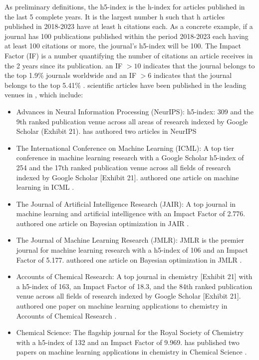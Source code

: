 \documentclass[11pt]{article}
\begin{document}
As preliminary definitions, the h5-index is the h-index for articles published in the last 5 complete years. It is the largest number h such that h articles published in 2018-2023 have at least h citations each. As a concrete example, if a journal has 100 publications published within the period 2018-2023 each having at least 100 citations or more, the journal's h5-index will be 100. The Impact Factor (IF) is a number quantifying the number of citations an article receives in the 2 years since its publication. an IF $> 10$ indicates that the journal belongs to the top 1.9\% journals worldwide and an IF $> 6$ indicates that the journal belongs to the top 5.41\% \cite{impact_factor}. \drs scientific articles have been published in the leading venues in \fie{}, which include:
\begin{itemize}
    \item Advances in Neural Information Processing (NeurIPS): h5-index: 309 and the 9th ranked publication venue across all areas of research indexed by Google Scholar (Exhibit 21). \dr has authored two articles in NeurIPS \cite{cv, gauche, chatgpt}
    \item The International Conference on Machine Learning (ICML): A top tier conference in machine learning research with a Google Scholar h5-index of 254 and the 17th ranked publication venue across all fields of research indexed by Google Scholar [Exhibit 21]. \dr authored one article on machine learning in ICML \cite{sensors}.
    \item The Journal of Artificial Intelligence Research (JAIR): A top journal in machine learning and artificial intelligence with an Impact Factor of 2.776. \dr authored one article on Bayesian optimization in JAIR \cite{cv, hebo}.
    \item The Journal of Machine Learning Research (JMLR): JMLR is the premier journal for machine learning research with a h5-index of 106 and an Impact Factor of 5.177. \dr authored one article on Bayesian optimization in JMLR \cite{cv, forget}.
    \item Accounts of Chemical Research: A top journal in chemistry [Exhibit 21] with a h5-index of 163, an Impact Factor of 18.3, and the 84th ranked publication venue across all fields of research indexed by Google Scholar [Exhibit 21]. \dr authored one paper on machine learning applications to chemistry in Accounts of Chemical Research \cite{cv, mapping}.    
    \item Chemical Science: The flagship journal for the Royal Society of Chemistry with a h5-index of 132 and an Impact Factor of 9.969. \dr has published two papers on machine learning applications in chemistry in Chemical Science \cite{cv, photo}.

\end{itemize}
\end{document}
